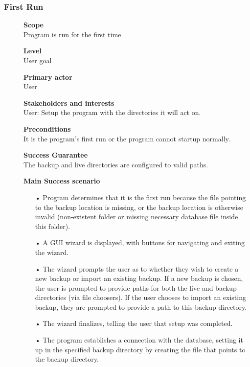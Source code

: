 \documentclass[12pt,a4paper]{article}
\begin{document}
\subsubsection{First Run}
\begin{description}
	\item[] \textbf{Scope} \hfill \\
		Program is run for the first time 
	\item[] \textbf{Level} \hfill \\
		User goal
	\item[] \textbf{Primary actor} \hfill \\
		User 
	\item[] \textbf{Stakeholders and interests} \hfill \\
		User: Setup the program with the directories it will act on.
	\item[] \textbf{Preconditions} \hfill \\
		It is the program's first run or the program cannot startup normally. 
	\item[] \textbf{Success Guarantee} \hfill \\
		The backup and live directories are configured to valid paths.
	\item[] \textbf{Main Success scenario} \hfill \vspace{-4ex} \\
	\begin{itemize}
		\item[•] Program determines that it is the first run because the file pointing to the backup location is missing, or the backup location is otherwise invalid (non-existent folder or missing necessary database file inside this folder). 
		\item[•] A GUI wizard is displayed, with buttons for navigating and exiting the wizard. 
		\item[•] The wizard prompts the user as to whether they wish to create a new backup or import an existing backup. 
				If a new backup is chosen, the user is prompted to provide paths for both the live and backup directories (via file choosers). 
				If the user chooses to import an existing backup, they are prompted to provide a path to this backup directory. 
		\item[•] The wizard finalizes, telling the user that setup was completed. 
		\item[•] The program establishes a connection with the database, setting it up in the specified backup directory by creating the file that points to the backup directory. 

\end{itemize}
\end{description}
\end{document}
